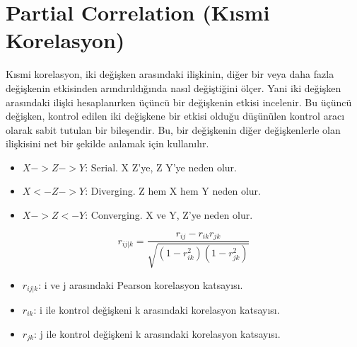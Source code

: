\section{Partial Correlation (Kısmi Korelasyon)}

Kısmi korelasyon, iki değişken arasındaki ilişkinin, diğer bir veya daha fazla değişkenin etkisinden arındırıldığında nasıl değiştiğini ölçer. Yani iki değişken arasındaki ilişki hesaplanırken üçüncü bir değişkenin etkisi incelenir. Bu üçüncü değişken, kontrol edilen iki değişkene bir etkisi olduğu düşünülen kontrol aracı olarak sabit tutulan bir bileşendir. Bu, bir değişkenin diğer değişkenlerle olan ilişkisini net bir şekilde anlamak için kullanılır. 

\begin{itemize}
    \item $X -> Z -> Y$: Serial. X Z'ye, Z Y'ye neden olur.
    \item $X <- Z -> Y$: Diverging. Z hem X hem Y neden olur.
    \item $X -> Z <- Y$: Converging. X ve Y, Z'ye neden olur.
\end{itemize}

\[ r_{ij|k} = \frac{r_{ij} - r_{ik}r_{jk}}{\sqrt{(1 - r_{ik}^2)(1 - r_{jk}^2)}} \]

\begin{itemize}
    \item $r_{ij|k}$: i ve j arasındaki Pearson korelasyon katsayısı.
    \item $r_{ik}$: i ile kontrol değişkeni k arasındaki korelasyon katsayısı.
    \item $r_{jk}$: j ile kontrol değişkeni k arasındaki korelasyon katsayısı.
\end{itemize}

\newpage